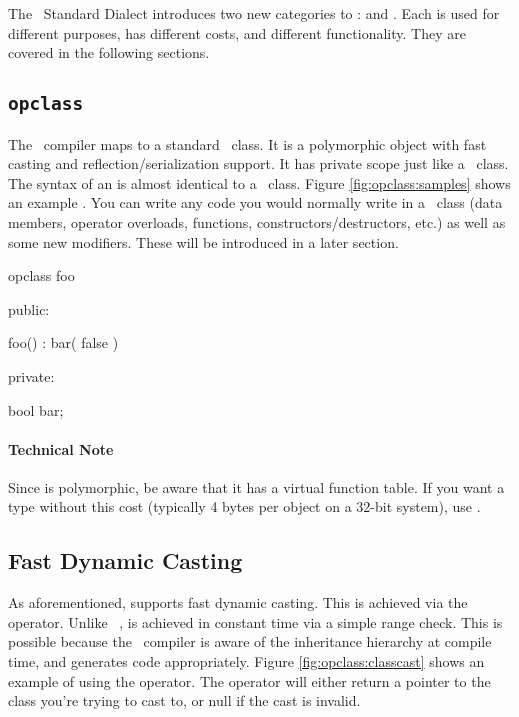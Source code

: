 The \opCPP\ Standard Dialect introduces two new categories to \cpp:  and .  Each is used for different purposes, has different costs, and different functionality.  They are covered in the following sections.

\subsection{{\tt opclass}}
\label{subsec:opclass}

The \opCPP\ compiler maps  to a standard \cpp\ class.  It is a polymorphic object with fast casting and reflection/serialization support.  It has private scope just like a \cpp\ class.  The syntax of an  is almost identical to a \cpp\ class.  Figure \ref{fig:opclass:samples} shows an example .  You can write any code you would normally write in a \cpp\ class (data members, operator overloads, functions, constructors/destructors, etc.) as well as some new modifiers.  These will be introduced in a later section.

\begin{opcpp}[label={fig:opclass:samples},caption={A simple \opcppk{opclass}.}]
opclass foo
{
public:

    foo() : bar( false )
    {

    }

private:

    bool bar;
}
\end{opcpp}

\paragraph{Technical Note}
Since  is polymorphic, be aware that it has a virtual function table.  If
you want a type without this cost (typically 4 bytes per object on a 32-bit system),
use .

\subsection{Fast Dynamic Casting}
\label{subsec:opclass:fast_dynamic_casting}

As aforementioned,  supports fast dynamic casting.  This is achieved via the  operator.  Unlike \cpp\ ,  is achieved in constant time via a simple range check.  This is possible because the \opCPP\ compiler is aware of the inheritance hierarchy at compile time, and generates code appropriately.  Figure \ref{fig:opclass:classcast} shows an example of using the  operator.  The  operator will either return a pointer to the class you're trying to cast to, or null if the cast is invalid.

